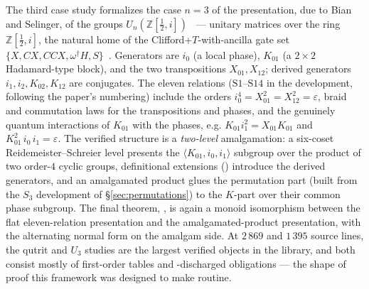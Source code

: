 The third case study formalizes the case $n = 3$ of the presentation, due
to Bian and Selinger, of the groups
$U_n(\mathbb{Z}[\tfrac12,i])$~\cite{bian2021un} --- unitary matrices over
the ring $\mathbb{Z}[\tfrac12,i]$, the natural home of the
Clifford+$T$-with-ancilla gate set
$\{X, CX, CCX, \omega^\dagger H, S\}$~\cite{amy2020numbertheoretic}.
Generators are $i_0$ (a local phase), $K_{01}$ (a $2{\times}2$
Hadamard-type block), and the two transpositions $X_{01}, X_{12}$;
derived generators $i_1, i_2, K_{02}, K_{12}$ are conjugates.  The eleven
relations ($\mathrm{S1}$--$\mathrm{S14}$ in the development, following the
paper's numbering) include the orders $i_0^4 = X_{01}^2 = X_{12}^2 =
\varepsilon$, braid and commutation laws for the transpositions and
phases, and the genuinely quantum interactions of $K_{01}$ with the
phases, e.g.
$K_{01} i_1^2 = X_{01} K_{01}$ and
$K_{01}^2\, i_0\, i_1 = \varepsilon$.  The verified structure is a
\emph{two-level} amalgamation: a six-coset Reidemeister--Schreier level
presents the $\langle K_{01}, i_0, i_1 \rangle$ subgroup over the product
of two order-$4$ cyclic groups, definitional extensions
() introduce the derived generators, and an amalgamated
product glues the permutation part (built from the $S_3$ development of
\S\ref{sec:permutations}) to the $K$-part over their common phase
subgroup.  The final theorem,
, is again a monoid isomorphism between
the flat eleven-relation presentation and the amalgamated-product
presentation, with the alternating normal form on the amalgam side.  At
$2\,869$ and $1\,395$ source lines, the qutrit and $U_3$ studies are the
largest verified objects in the library, and both consist mostly of
first-order tables and -discharged obligations --- the shape of
proof this framework was designed to make routine.

